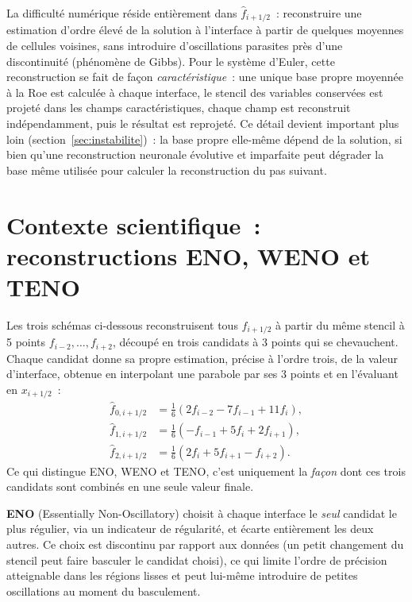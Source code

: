 \documentclass[11pt]{article}
\begin{document}
La difficulté numérique réside entièrement dans $\hat f_{i+1/2}$~:
reconstruire une estimation d'ordre élevé de la solution à l'interface à
partir de quelques moyennes de cellules voisines, sans introduire
d'oscillations parasites près d'une discontinuité (phénomène de Gibbs).
Pour le système d'Euler, cette reconstruction se fait de façon
\emph{caractéristique}~: une unique base propre moyennée à la Roe est
calculée à chaque interface, le stencil des variables conservées est
projeté dans les champs caractéristiques, chaque champ est reconstruit
indépendamment, puis le résultat est reprojeté. Ce détail devient
important plus loin (section~\ref{sec:instabilite})~: la base propre
elle-même dépend de la solution, si bien qu'une reconstruction neuronale
évolutive et imparfaite peut dégrader la base même utilisée pour calculer
la reconstruction du pas suivant.

\section{Contexte scientifique~: reconstructions ENO, WENO et TENO}
\label{sec:fond-schemas}

Les trois schémas ci-dessous reconstruisent tous $\hat f_{i+1/2}$ à
partir du même stencil à 5 points $f_{i-2},\dots,f_{i+2}$, découpé en
trois candidats à 3 points qui se chevauchent. Chaque candidat donne sa
propre estimation, précise à l'ordre trois, de la valeur d'interface,
obtenue en interpolant une parabole par ses 3 points et en l'évaluant en
$x_{i+1/2}$~:
\begin{align*}
\hat f_{0,i+1/2} &= \tfrac{1}{6}(2f_{i-2} - 7f_{i-1} + 11f_i), \\
\hat f_{1,i+1/2} &= \tfrac{1}{6}(-f_{i-1} + 5f_i + 2f_{i+1}), \\
\hat f_{2,i+1/2} &= \tfrac{1}{6}(2f_i + 5f_{i+1} - f_{i+2}).
\end{align*}
Ce qui distingue ENO, WENO et TENO, c'est uniquement la \emph{façon} dont
ces trois candidats sont combinés en une seule valeur finale.

\textbf{ENO} (Essentially Non-Oscillatory) choisit à chaque interface le
\emph{seul} candidat le plus régulier, via un indicateur de régularité,
et écarte entièrement les deux autres. Ce choix est discontinu par
rapport aux données (un petit changement du stencil peut faire basculer
le candidat choisi), ce qui limite l'ordre de précision atteignable dans
les régions lisses et peut lui-même introduire de petites oscillations au
moment du basculement.
\end{document}

